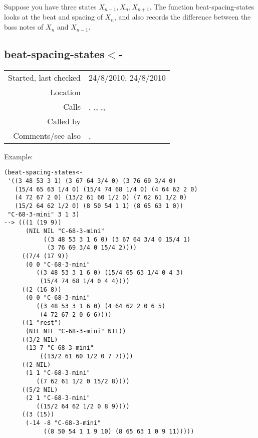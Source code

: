 \noindent Suppose you have three states $X_{n-1}, X_n,
X_{n+1}$. The function beat-spacing-states looks at
the beat and spacing of $X_n$, and also records the
difference between the bass notes of $X_n$ and
$X_{n-1}$.


\subsection*{beat-spacing-states$<$-}\label{fun:beat-spacing-states<-}

\vspace{0.3cm}
\begin{tabular}{r|p{8cm}}
Started, last checked & 24/8/2010, 24/8/2010 \\
Location & \nameref{sec:spacing-states} \\
Calls & \nameref{fun:append-offtimes}, \nameref{fun:bass-steps-with-rests},\newline \nameref{fun:enumerate-append}, \nameref{fun:nth-list-of-lists},\newline \nameref{fun:segments-strict}, \nameref{fun:spacing} \\
Called by & \\
Comments/see also & \nameref{fun:beat-spacing-states}, \nameref{fun:spacing-holding-states}
\end{tabular}

\vspace{0.5cm}
\noindent Example:
\begin{verbatim}
(beat-spacing-states<-
 '((3 48 53 3 1) (3 67 64 3/4 0) (3 76 69 3/4 0)
   (15/4 65 63 1/4 0) (15/4 74 68 1/4 0) (4 64 62 2 0)
   (4 72 67 2 0) (13/2 61 60 1/2 0) (7 62 61 1/2 0)
   (15/2 64 62 1/2 0) (8 50 54 1 1) (8 65 63 1 0))
 "C-68-3-mini" 3 1 3)
--> (((1 (19 9))
      (NIL NIL "C-68-3-mini"
           ((3 48 53 3 1 6 0) (3 67 64 3/4 0 15/4 1)
            (3 76 69 3/4 0 15/4 2))))
     ((7/4 (17 9))
      (0 0 "C-68-3-mini"
         ((3 48 53 3 1 6 0) (15/4 65 63 1/4 0 4 3)
          (15/4 74 68 1/4 0 4 4))))
     ((2 (16 8))
      (0 0 "C-68-3-mini"
         ((3 48 53 3 1 6 0) (4 64 62 2 0 6 5)
          (4 72 67 2 0 6 6))))
     ((1 "rest")
      (NIL NIL "C-68-3-mini" NIL))
     ((3/2 NIL)
      (13 7 "C-68-3-mini"
          ((13/2 61 60 1/2 0 7 7))))
     ((2 NIL)
      (1 1 "C-68-3-mini"
         ((7 62 61 1/2 0 15/2 8))))
     ((5/2 NIL)
      (2 1 "C-68-3-mini"
         ((15/2 64 62 1/2 0 8 9))))
     ((3 (15))
      (-14 -8 "C-68-3-mini"
           ((8 50 54 1 1 9 10) (8 65 63 1 0 9 11)))))
\end{verbatim}

